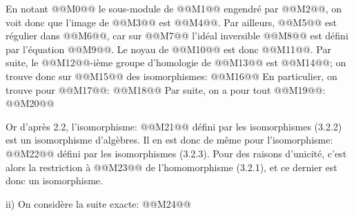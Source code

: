 
En
notant @@M0@@ le sous-module de @@M1@@ engendré par @@M2@@, on voit donc que l'image de @@M3@@ est @@M4@@. Par ailleurs, @@M5@@ est régulier dans @@M6@@, car sur @@M7@@ l'idéal inversible @@M8@@ est défini par l'équation @@M9@@. Le noyau de @@M10@@ est donc @@M11@@. Par suite, le @@M12@@-ième groupe d'homologie de @@M13@@ est @@M14@@; on trouve donc sur @@M15@@ des isomorphismes:
@@M16@@
En particulier, on trouve pour @@M17@@:
@@M18@@
Par suite, on a pour tout @@M19@@:
@@M20@@

Or d'après 2.2, l'isomorphisme:
@@M21@@
défini par les isomorphismes (3.2.2) est un isomorphisme d'algèbres. Il en est donc de même pour l'isomorphisme:
@@M22@@
défini par les isomorphismes (3.2.3). Pour des raisons d'unicité, c'est alors la restriction à @@M23@@ de l'homomorphisme (3.2.1), et ce dernier est donc un isomorphisme.

ii) On considère la suite exacte:
@@M24@@
